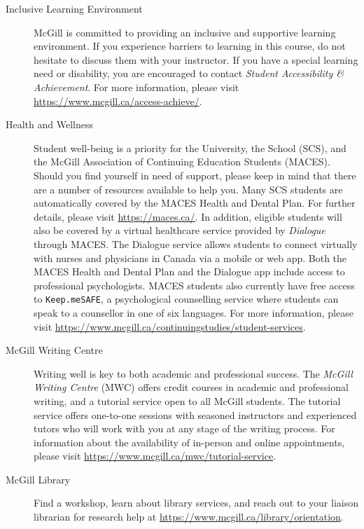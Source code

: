 \documentclass{article}
\begin{document}
\begin{description}
\item[Inclusive Learning Environment]{McGill is committed to providing
  an inclusive and supportive learning environment. If you experience
  barriers to learning in this course, do not hesitate to discuss them
  with your instructor. If you have a special learning need or
  disability, you are encouraged to contact
{\em Student Accessibility \& Achievement}.
  For more information, please visit
  \url{https://www.mcgill.ca/access-achieve/}.}
  
\item[Health and Wellness]{Student well-being is a priority for the
  University, the School (SCS), and the McGill Association of
  Continuing Education Students (MACES). Should you find yourself in
  need of support, please keep in mind that there are a number of
  resources available to help you. Many SCS students are automatically
  covered by the MACES Health and Dental Plan. For further details,
  please visit \url{https://maces.ca/}. In addition, eligible students
  will also be covered by a virtual healthcare service provided by
  {\em Dialogue} through MACES. The Dialogue service allows students
  to connect virtually with nurses and physicians in Canada via a
  mobile or web app. Both the MACES Health and Dental Plan and the
  Dialogue app include access to professional psychologists. MACES
  students also currently have free access to \texttt{Keep.meSAFE}, a
  psychological counselling service where students can speak to a
  counsellor in one of six languages. For more information, please
  visit
  \url{https://www.mcgill.ca/continuingstudies/student-services}.}
\item[McGill Writing Centre]{Writing well is key to both academic and
  professional success. The {\em McGill Writing Centre} (MWC) offers
  credit courses in academic and professional writing, and a tutorial
  service open to all McGill students. The tutorial service offers
  one-to-one sessions with seasoned instructors and experienced tutors
  who will work with you at any stage of the writing process.  For
  information about the availability of in-person and online
  appointments, please visit
  \url{https://www.mcgill.ca/mwc/tutorial-service}.}
\item[McGill Library]{Find a workshop, learn about library services,
  and reach out to your liaison librarian for research help at
  \url{https://www.mcgill.ca/library/orientation}.}
\end{description}
\end{document}
